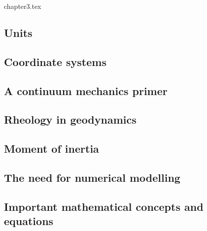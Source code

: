 \begin{flushright} {\tiny {\color{gray} chapter3.tex}} \end{flushright}

\subsection{Units}  %
\subsection{Coordinate systems}  \label{ss:coordsys} %
\subsection{A continuum mechanics primer} %
\newpage
\subsection{Rheology in geodynamics}  %
\subsection{Moment of inertia}  %
\subsection{The need for numerical modelling} %
\newpage
\subsection{Important mathematical concepts and equations}  \label{ss:maths} %
